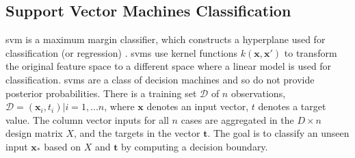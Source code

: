 \documentclass[11pt, runningheads,a4paper]{llncs}
\begin{document}


\subsection{Support Vector Machines Classification}

\ac{svm} is a maximum margin classifier, which constructs a hyperplane used for classification (or regression) \cite{Bishop:2006:PRM:1162264}. \acp{svm} use kernel functions $k(\mathbf{x},\mathbf{x'})$ to transform the original feature space to a different space where a linear model is used for classification. \acp{svm} are a class of decision machines and so do not provide posterior probabilities. There is a training set $\mathcal{D}$ of $n$ observations, $\mathcal{D}={(\mathbf{x}_i,t_{i}) | i = 1, ... n} $, where $\mathbf{x}$ denotes an input vector, $t$ denotes a target value. The column vector inputs for all $n$ cases are aggregated in the $D \times n$ design matrix $X$, and the targets in the vector $\mathbf{t}$. The goal is to classify an unseen input $\mathbf{x_{*}}$ based on $X$ and $\mathbf{t}$ by computing a decision boundary. 


\end{document}
